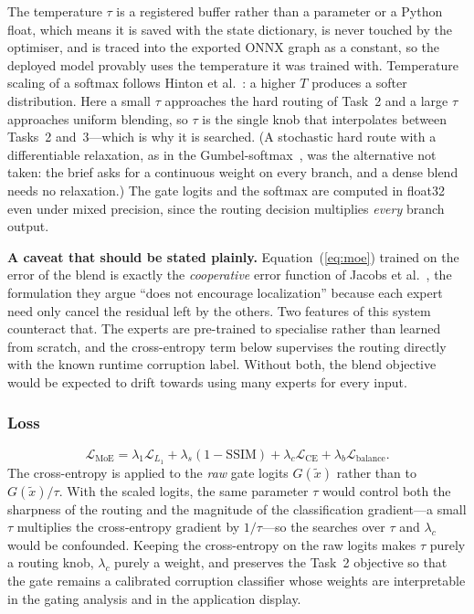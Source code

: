 \documentclass[conference]{IEEEtran}
\begin{document}
The temperature $\tau$ is a registered buffer rather than a parameter or a Python
float, which means it is saved with the state dictionary, is never touched by the
optimiser, and is traced into the exported ONNX graph as a constant, so the
deployed model provably uses the temperature it was trained with. Temperature
scaling of a softmax follows Hinton et al.~\cite{hinton2015distilling}: a higher
$T$ produces a softer distribution. Here a small $\tau$ approaches the hard
routing of Task~2 and a large $\tau$ approaches uniform blending, so $\tau$ is
the single knob that interpolates between Tasks~2 and~3---which is why it is
searched. (A stochastic hard route with a differentiable relaxation, as in the
Gumbel-softmax~\cite{jang2017categorical}, was the alternative not taken: the
brief asks for a continuous weight on every branch, and a dense blend needs no
relaxation.) The gate logits and the softmax are computed in float32 even under
mixed precision, since the routing decision multiplies \emph{every} branch
output.

\textbf{A caveat that should be stated plainly.} Equation~(\ref{eq:moe}) trained
on the error of the blend is exactly the \emph{cooperative} error function of
Jacobs et al.~\cite{jacobs1991adaptive}, the formulation they argue ``does not
encourage localization'' because each expert need only cancel the residual left
by the others. Two features of this system counteract that. The experts are
pre-trained to specialise rather than learned from scratch, and the
cross-entropy term below supervises the routing directly with the known runtime
corruption label. Without both, the blend objective would be expected to drift
towards using many experts for every input.

\subsubsection{Loss}

\begin{equation}
  \mathcal{L}_\text{MoE} = \lambda_1 \mathcal{L}_{L_1} + \lambda_s (1 - \mathrm{SSIM}) + \lambda_c \mathcal{L}_\text{CE} + \lambda_b \mathcal{L}_\text{balance}.
  \label{eq:moeloss}
\end{equation}
The cross-entropy is applied to the \emph{raw} gate logits $G(\tilde{x})$ rather
than to $G(\tilde{x})/\tau$. With the scaled logits, the same parameter $\tau$
would control both the sharpness of the routing and the magnitude of the
classification gradient---a small $\tau$ multiplies the cross-entropy gradient by
$1/\tau$---so the searches over $\tau$ and $\lambda_c$ would be confounded.
Keeping the cross-entropy on the raw logits makes $\tau$ purely a routing knob,
$\lambda_c$ purely a weight, and preserves the Task~2 objective so that the gate
remains a calibrated corruption classifier whose weights are interpretable in the
gating analysis and in the application display.
\end{document}
